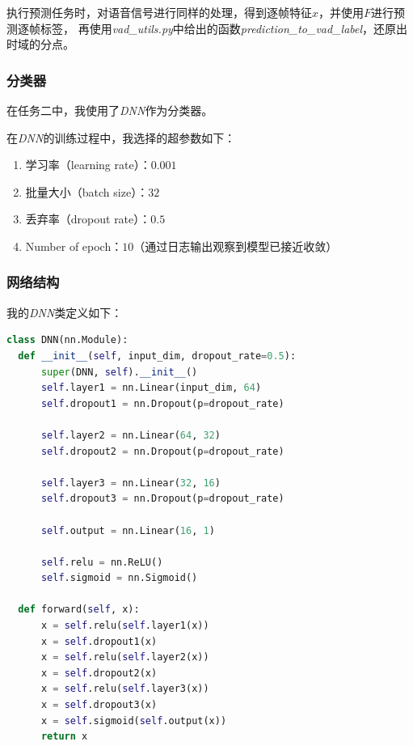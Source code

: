 \documentclass[a4paper]{article}
\begin{document}
执行预测任务时，对语音信号进行同样的处理，得到逐帧特征$x$，并使用$F$进行预测逐帧标签，
再使用\emph{vad\_utils.py}中给出的函数\emph{prediction\_to\_vad\_label}，还原出时域的分点。

\subsubsection{分类器}
在任务二中，我使用了\emph{DNN}作为分类器。

在\emph{DNN}的训练过程中，我选择的超参数如下：
\begin{enumerate}
  \item 学习率（learning rate）：$0.001$
  \item 批量大小（batch size）：$32$
  \item 丢弃率（dropout rate）：$0.5$
  \item Number of epoch：$10$（通过日志输出观察到模型已接近收敛）
\end{enumerate}

\subsubsection{网络结构}
我的\emph{DNN}类定义如下：\\
\begin{lstlisting}[language=python]
class DNN(nn.Module):
  def __init__(self, input_dim, dropout_rate=0.5):
      super(DNN, self).__init__()
      self.layer1 = nn.Linear(input_dim, 64)
      self.dropout1 = nn.Dropout(p=dropout_rate)

      self.layer2 = nn.Linear(64, 32)
      self.dropout2 = nn.Dropout(p=dropout_rate)

      self.layer3 = nn.Linear(32, 16)
      self.dropout3 = nn.Dropout(p=dropout_rate)

      self.output = nn.Linear(16, 1)

      self.relu = nn.ReLU()
      self.sigmoid = nn.Sigmoid()

  def forward(self, x):
      x = self.relu(self.layer1(x))
      x = self.dropout1(x)
      x = self.relu(self.layer2(x))
      x = self.dropout2(x)
      x = self.relu(self.layer3(x))
      x = self.dropout3(x)
      x = self.sigmoid(self.output(x))
      return x

\end{lstlisting}
\end{document}
